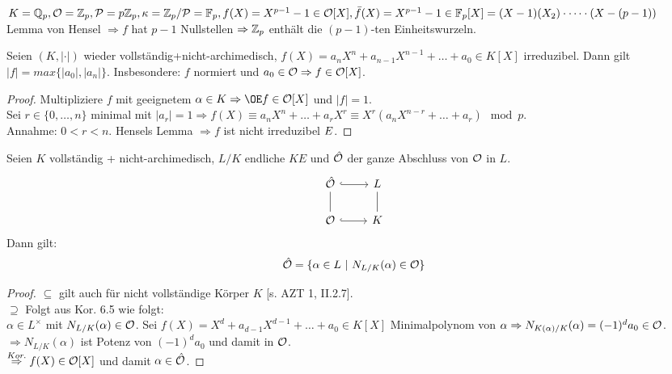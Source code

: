 \begin{Bsp}
$K=\mathbb{Q}_p, \mathcal{O}=\mathbb{Z}_p, \mathcal{P}=p\mathbb{Z}_p, \kappa = \mathbb{Z}_p/\mathcal{P}=\mathbb{F}_p, f(X)=X^{p-1}-1 \in \mathcal{O}[X], \bar{f}(X)=X^{p-1} -1 \in \mathbb{F}_p[X]=(X-1)(X_2)\cdot \dots \cdot (X-(p-1))$\\
Lemma von Hensel $\Rightarrow f$ hat $p-1$ Nullstellen $\Rightarrow \mathbb{Z}_p$ enthält die $(p-1)$-ten Einheitswurzeln.
\end{Bsp}

\begin{Kor}
Seien $(K, |\cdot|)$ wieder vollständig+nicht-archimedisch, $f(X)=a_nX^n+a_{n-1}X^{n-1} + \dots + a_0 \in K[X]$ irreduzibel. Dann gilt $|f|=max\{|a_0|, |a_n|\}$. Insbesondere: $f$ normiert und $a_0 \in \mathcal{O} \Rightarrow f \in \mathcal{O}[X]$.
\end{Kor}

\begin{proof}
Multipliziere $f$ mit geeignetem $\alpha \in K \Rightarrow \OE f \in \O[X]$ und $|f|=1$.\\
Sei $r \in \{0, \dots, n\}$ minimal mit $|a_r|=1 \Rightarrow f(X)\equiv a_nX^n+\dots+a_rX^r \equiv X^r(a_nX^{n-r}+ \dots +a_r) \mod p$.\\
Annahme: $0 < r< n$. Hensels Lemma $\Rightarrow f$ ist nicht irreduzibel $\Lightning$.
\end{proof}

\begin{Lem}
Seien $K$ vollständig + nicht-archimedisch, $L/K$ endliche $KE$ und $\hat{\mathcal{O}}$ der ganze Abschluss von $\mathcal{O}$ in $L$.
\[\begin{tikzcd}
\hO \arrow[r, hookrightarrow] & L\\
\O \arrow[u, dash] \arrow[r, hookrightarrow] & K \arrow[u, dash]
\end{tikzcd}\]
Dann gilt:
\[\hat{\mathcal{O}}=\{\alpha \in L \ | \ N_{L/K}(\alpha) \in \mathcal{O}\}\]
\end{Lem}

\begin{proof}
\glqq $\subseteq$ \grqq gilt auch für nicht vollständige Körper $K$ [s. AZT 1, II.2.7].\\
\glqq $\supseteq$ \grqq Folgt aus Kor. 6.5 wie folgt:\\
$\alpha \in L^\times$ mit $N_{L/K}(\alpha) \in \mathcal{O}$. Sei $f(X)=X^d+a_{d-1} X^{d-1}+\dots+a_0 \in K[X]$ Minimalpolynom von $\alpha \Rightarrow N_{K(\alpha)/K}(\alpha)=(-1)^da_0 \in \mathcal{O}$.\\
$\Rightarrow N_{L/K}(\alpha)$ ist Potenz von $(-1)^d a_0$ und damit in $\mathcal{O}$.\\
$\stackrel{Kor.}{\Rightarrow} f(X) \in \mathcal{O}[X]$ und damit $\alpha \in \hat{\mathcal{O}}$.
\end{proof}

